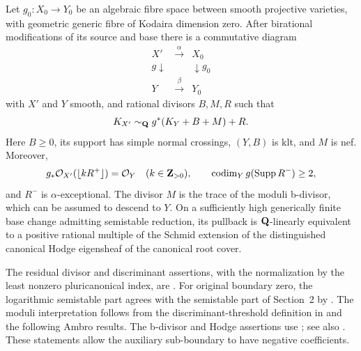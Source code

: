 \begin{theorem}
\label{altord:cb:parabolic}
Let \(g_0:X_0\to Y_0\) be an algebraic fibre space between smooth
projective varieties, with geometric generic fibre of Kodaira dimension
zero.  After birational modifications of its source and base there is a
commutative diagram
\[
\begin{array}{ccc}
 X'&\xrightarrow{\alpha}&X_0\\
 {\scriptstyle g}\downarrow&&\downarrow{\scriptstyle g_0}\\
 Y&\xrightarrow{\beta}&Y_0
\end{array}
\]
with \(X'\) and \(Y\) smooth, and rational divisors \(B,M,R\) such that
\begin{equation}
\label{altord:cb:formula}
 K_{X'}\sim_{\mathbf Q}g^*(K_Y+B+M)+R.
\end{equation}
Here \(B\geq0\), its support has simple normal crossings, \((Y,B)\) is
klt, and \(M\) is nef.  Moreover,
\begin{equation}
\label{altord:cb:residual}
 g_*\mathcal O_{X'}(\lfloor kR^+\rfloor)=\mathcal O_Y
 \quad(k\in\mathbf Z_{>0}),
 \qquad
 \operatorname{codim}_Y g(\operatorname{Supp} R^-)\geq2,
\end{equation}
and \(R^-\) is \(\alpha\)-exceptional.
The divisor \(M\) is the trace of the moduli b-divisor, which can be
assumed to descend to \(Y\).  On a sufficiently high generically finite
base change admitting semistable reduction, its pullback is
\(\mathbf Q\)-linearly equivalent to a positive rational multiple of the
Schmid extension of the distinguished canonical Hodge eigensheaf of
the canonical root cover.
\end{theorem}

The residual divisor and discriminant assertions, with the normalization
by the least nonzero pluricanonical index, are
\cite[\S4.4 and Theorem~4.5(i)--(v)]{FujinoMori}.
For original boundary zero, the logarithmic semistable part agrees
with the semistable part of Section~2 by
\cite[Proposition~4.7]{FujinoMori}.
The moduli interpretation follows from the discriminant-threshold
definition in \cite[Definition~4.3]{FujinoMori} and the following Ambro
results.  The b-divisor and Hodge assertions use
\cite[Theorems~0.2 and~4.4(1),(3), Lemma~5.2(4)--(5), and
Propositions~5.4--5.5]{AmbroBoundary};
see also \cite[Proposition~3.1]{AmbroModuli}.
These statements allow the auxiliary sub-boundary to have negative
coefficients.

